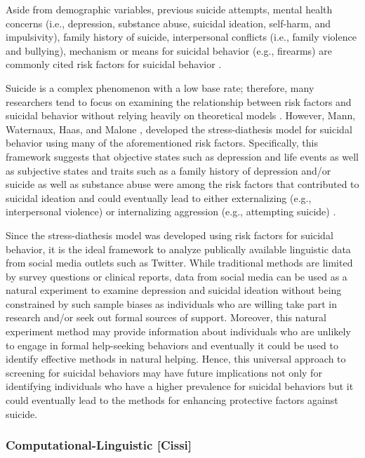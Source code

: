 \documentclass[11pt]{article}
\begin{document}
	Aside from demographic variables, previous suicide attempts, mental health concerns (i.e., depression, substance abuse, suicidal ideation, self-harm, and impulsivity), family history of suicide, interpersonal conflicts (i.e., family violence and bullying), mechanism or means for suicidal behavior (e.g., firearms)  are commonly cited risk factors for suicidal behavior \cite{nock2008suicide,crosby2011self,gaynes2004screening,harriss2005suicidal,shaffer2004columbia,shaffer2004columbia,brown2000risk}. 

Suicide is a complex phenomenon with a low base rate; therefore, many researchers tend to focus on examining the relationship between risk factors and suicidal behavior without relying heavily on theoretical models \cite{nock2008suicide} .  However, Mann, Waternaux, Haas, and Malone \cite{mann1999toward}, developed the stress-diathesis model for suicidal behavior using many of the aforementioned risk factors. Specifically, this framework suggests that objective states such as depression and life events as well as subjective states and traits such as a family history of depression and/or suicide as well as substance abuse were among the risk factors that contributed to suicidal ideation and could eventually lead to either externalizing (e.g., interpersonal violence) or internalizing aggression (e.g., attempting suicide) \cite{mann1999toward}.

	Since the stress-diathesis model was developed using risk factors for suicidal behavior, it is the ideal framework to analyze publically available linguistic data from social media outlets such as Twitter. While traditional methods are limited by survey questions or clinical reports, data from social media can be used as a natural experiment to examine depression and suicidal ideation without being constrained by such sample biases as individuals who are willing take part in research and/or seek out formal sources of support. Moreover, this natural experiment method may provide information about individuals who are unlikely to engage in formal help-seeking behaviors and eventually it could be used to identify effective methods in natural helping. Hence, this universal approach to screening for suicidal behaviors may have future implications not only for identifying individuals who have a higher prevalence for suicidal behaviors but it could eventually lead to the methods for enhancing protective factors against suicide.  


\subsubsection{Computational-Linguistic [Cissi]}
\end{document}
